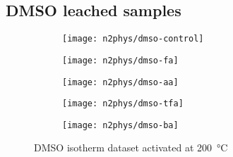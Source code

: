 \subsection{DMSO leached samples}
\begin{figure}[H]
    \centering
    \begin{subfigure}{0.46\linewidth}
        \texttt{[image: n2phys/dmso-control]}%
        \label{appx:def:fig:n2phys-dmso-cont}
    \end{subfigure}%
    \begin{subfigure}{0.46\linewidth}
        \texttt{[image: n2phys/dmso-fa]}%
        \label{appx:def:fig:n2phys-dmso-fa}
    \end{subfigure}%

    
    \begin{subfigure}{0.46\linewidth}
        \texttt{[image: n2phys/dmso-aa]}%
        \label{appx:def:fig:n2phys-dmso-aa}
    \end{subfigure}%
    \begin{subfigure}{0.46\linewidth}
        \texttt{[image: n2phys/dmso-tfa]}%
        \label{appx:def:fig:n2phys-dmso-tfa}
    \end{subfigure}%

    \begin{subfigure}{0.46\linewidth}
        \texttt{[image: n2phys/dmso-ba]}%
        \label{appx:def:fig:n2phys-dmso-ba}
    \end{subfigure}%

    \caption{\gls{DMSO} isotherm dataset activated at \SI{200}{\degreeCelsius}}%
    
\end{figure}

